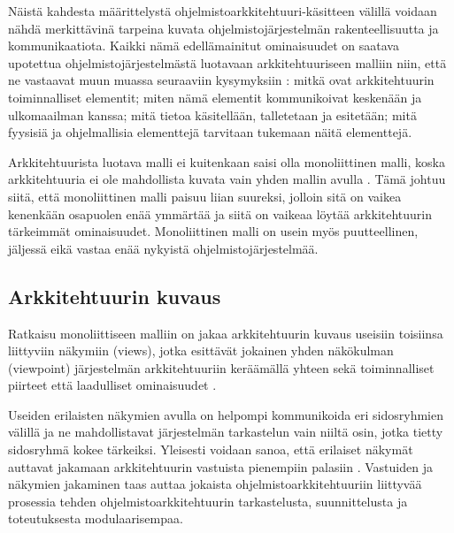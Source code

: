 \documentclass[finnish]{tktltiki2}
\numberwithin{table}{section}
\theoremstyle{definition}
\theoremstyle{remark}
\begin{document}
Näistä kahdesta määrittelystä ohjelmistoarkkitehtuuri-käsitteen välillä voidaan nähdä merkittävinä tarpeina kuvata ohjelmistojärjestelmän rakenteellisuutta ja kommunikaatiota. Kaikki nämä edellämainitut ominaisuudet on saatava  upotettua ohjelmistojärjestelmästä luotavaan arkkitehtuuriseen malliin niin, että ne vastaavat muun muassa seuraaviin kysymyksiin \citep[s. 31 - 33]{Rozanski:2011:SSA:2072649}: mitkä ovat arkkitehtuurin toiminnalliset elementit; miten nämä elementit kommunikoivat keskenään ja ulkomaailman kanssa; mitä tietoa käsitellään, talletetaan ja esitetään; mitä fyysisiä ja ohjelmallisia elementtejä tarvitaan tukemaan näitä elementtejä.

Arkkitehtuurista luotava malli ei kuitenkaan saisi olla monoliittinen malli, koska arkkitehtuuria ei ole mahdollista kuvata vain yhden mallin avulla \citep{Rozanski:2011:SSA:2072649}. Tämä johtuu siitä, että monoliittinen malli paisuu liian suureksi, jolloin sitä on vaikea kenenkään osapuolen enää ymmärtää ja siitä on vaikeaa löytää arkkitehtuurin tärkeimmät ominaisuudet. Monoliittinen malli on usein myös puutteellinen, jäljessä eikä vastaa enää nykyistä ohjelmistojärjestelmää.  


\subsection{Arkkitehtuurin kuvaus}

Ratkaisu monoliittiseen malliin on jakaa arkkitehtuurin kuvaus useisiin toisiinsa liittyviin näkymiin (views), jotka esittävät jokainen yhden näkökulman (viewpoint) järjestelmän arkkitehtuuriin keräämällä yhteen sekä toiminnalliset piirteet että laadulliset ominaisuudet \citetext{\citealp{Ran:1998:ASV:288408.288438}; \citealp[s. 33-34]{Rozanski:2011:SSA:2072649}; \citealp[s. 8-9]{gorton_understanding_2011}}.

Useiden erilaisten näkymien avulla on helpompi kommunikoida eri sidosryhmien välillä ja ne mahdollistavat järjestelmän tarkastelun vain niiltä osin, jotka tietty sidosryhmä kokee tärkeiksi. Yleisesti voidaan sanoa, että erilaiset näkymät auttavat jakamaan arkkitehtuurin vastuista pienempiin palasiin \citep[s. 2]{Galster:2011:DTC:2031759.2031761}. Vastuiden ja näkymien jakaminen taas auttaa jokaista ohjelmistoarkkitehtuuriin liittyvää prosessia tehden ohjelmistoarkkitehtuurin tarkastelusta, suunnittelusta ja toteutuksesta modulaarisempaa.

\end{document}
